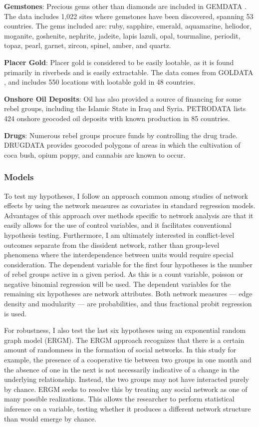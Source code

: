 \textbf{Gemstones}: Precious gems other than diamonds are included in GEMDATA \citep{Lujala2008}. The data includes 1,022 sites where gemstones have been discovered, spanning 53 countries. The gems included are: ruby, sapphire, emerald, aquamarine, heliodor, moganite, goshenite, nephrite, jadeite, lapis lazuli, opal, tourmaline, periodit, topaz, pearl, garnet, zircon, spinel, amber, and quartz.

\textbf{Placer Gold}: Placer gold is considered to be easily lootable, as it is found primarily in riverbeds and is easily extractable. The data comes from GOLDATA \citep{Balestri2012}, and includes 550 locations with lootable gold in 48 countries.

\textbf{Onshore Oil Deposits}: Oil has also provided a source of financing for some rebel groups, including the Islamic State in Iraq and Syria. PETRODATA \citep{Lujala2007} lists 424 onshore geocoded oil deposits with known production in 85 countries.

\textbf{Drugs}: Numerous rebel groups procure funds by controlling the drug trade. DRUGDATA \citep{Buhaug2005} provides geocoded polygons of areas in which the cultivation of coca bush, opium poppy, and cannabis are known to occur.

\subsubsection{Models}

To test my hypotheses, I follow an approach common among studies of network effects \citep[e.g.][]{Maoz2011,Metternich2013,Papachristos2015} by using the network measures as covariates in standard regression models. Advantages of this approach over methods specific to network analysis are that it easily allows for the use of control variables, and it facilitates conventional hypothesis testing. Furthermore, I am ultimately interested in conflict-level outcomes separate from the dissident network, rather than group-level phenomena where the interdependence between units would require special consideration. The dependent variable for the first four hypotheses is the number of rebel groups active in a given period. As this is a count variable, poisson or negative binomial regression will be used. The dependent variables for the remaining six hypotheses are network attributes. Both network measures --- edge density and modularity --- are probabilities, and thus fractional probit regression is used.

For robustness, I also test the last six hypotheses using an exponential random graph model (ERGM). The ERGM approach recognizes that there is a certain amount of randomness in the formation of social networks. In this study for example, the presence of a cooperative tie between two groups in one month and the absence of one in the next is not necessarily indicative of a change in the underlying relationship. Instead, the two groups may not have interacted purely by chance. ERGM seeks to resolve this by treating any social network as one of many possible realizations. This allows the researcher to perform statistical inference on a variable, testing whether it produces a different network structure than would emerge by chance.

